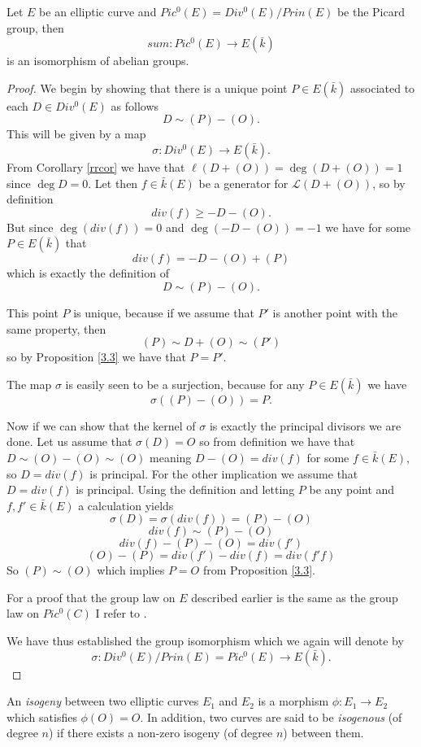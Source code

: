 \begin{thm} \label{isoteorem}
Let $E$ be an elliptic curve and $Pic^0(E) = Div^0(E)/Prin(E)$ be the Picard group, then
 $$ sum: Pic^0(E) \rightarrow E(\bar{k}) $$
is an isomorphism of abelian groups.
\end{thm}
\begin{proof}
 We begin by showing that there is a unique point $P \in E(\bar{k})$ associated to
each $D \in Div^0(E)$ as follows
$$ D \sim (P) -(O).$$
This will be given by a map
$$ \sigma: Div^0(E) \rightarrow E(\bar{k}). $$
From Corollary \ref{rrcor} we have that $\ell(D+(O)) = \deg(D+(O)) = 1$ since $\deg D = 0$.
Let then $f \in \bar{k}(E)$ be a generator for $\mathscr{L}(D+(O))$, so by definition
$$ div(f) \geq -D-(O). $$
But since $\deg(div(f)) = 0$ and $\deg(-D-(O)) = -1$ we have for some $P \in E(\bar{k})$ that
$$ div(f) = -D-(O)+(P) $$
which is exactly the definition of
$$ D \sim (P) - (O). $$

This point $P$ is unique, because if we assume that $P'$ is another point with the same
property, then
$$ (P) \sim D + (O) \sim (P') $$
so by Proposition \ref{3.3} we have that $ P = P'$.

The map $\sigma$ is easily seen to be a surjection, because for any $P \in E(\bar{k})$ we have
$$ \sigma((P)-(O)) = P.$$

Now if we can show that the kernel of $\sigma$ is exactly the principal divisors we are done.
Let us assume that $\sigma(D) = O$ so from definition we have that $D \sim (O)-(O) \sim (O)$
meaning $D - (O) = div(f)$ for some $f \in \bar{k}(E)$, so $D = div(f)$ is principal.
For the other implication we assume that $D = div(f)$ is principal. Using the definition and
letting $P$ be any point and $f, f' \in \bar{k}(E)$ a calculation yields
$$ \sigma(D) = \sigma(div(f)) = (P)-(O) $$
$$ div(f) \sim (P) - (O) $$
$$ div(f) - (P) - (O) = div(f') $$
$$ (O) - (P) = div(f') - div(f) = div(f' f) $$
So $ (P) \sim (O) $ which implies $P = O$ from Proposition \ref{3.3}.

For a proof that the group law on $E$ described earlier is the same as the group law on $Pic^0(C)$ I refer
to \cite{AEC}.

We have thus established the group isomorphism which we again will denote by
$$ \sigma : Div^0(E)/Prin(E) = Pic^0(E) \rightarrow E(\bar{k}).$$
\end{proof}

\begin{mydef}
 An \emph{isogeny} between two elliptic curves $E_1$ and $E_2$ is a morphism $\phi: E_1 \rightarrow E_2$
which satisfies $\phi(O) = O$. In addition, two curves are said to be \emph{isogenous} (of degree $n$) 
if there exists a non-zero isogeny (of degree $n$) between them.
\end{mydef}

